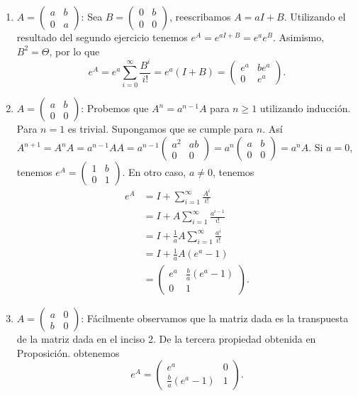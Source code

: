\documentclass{article}
\theoremstyle{definition}
\theoremstyle{remark}
\begin{document}
\begin{enumerate}
  \item
    $ A = \begin{pmatrix} a & b \\ 0 & a \end{pmatrix}$:
    Sea $B = \begin{pmatrix}0 & b \\ 0 & 0\end{pmatrix}$,
    reescribamos $A = a I + B$.
    Utilizando el resultado del segundo ejercicio tenemos
    $
      e^A = e^{aI + B} = e^a e^B.
    $
    Asimismo, $B^2 = \Theta$, por lo que
    \[
      e^A = e^a \sum_{i = 0}^{\infty} \frac{B^i}{i!} = e^a (I + B) =
      \begin{pmatrix} e^a & b e^a \\ 0 & e^a \end{pmatrix}.
    \]
  \item
    $ A = \begin{pmatrix} a & b \\ 0 & 0 \end{pmatrix}$:
    Probemos que $A^n = a^{n - 1} A$ para $n \geq 1$ utilizando inducci\'on.
    Para $n = 1$ es trivial. Supongamos que se cumple para $n$. As\'i
    $
    A^{n + 1} = A^n A = a^{n - 1} A A =
    a^{n - 1} \begin{pmatrix} a^2 & ab \\ 0 & 0 \end{pmatrix} =
    a^n \begin{pmatrix} a & b \\ 0 & 0 \end{pmatrix} =
    a^n A.
    $
    Si $a = 0$, tenemos $e^A =
    \begin{pmatrix}
        1 & b \\
        0 & 1
    \end{pmatrix}$.
    En otro caso, $a \neq 0$, tenemos
    \begin{align*}
      e^A &= I + \sum_{i = 1}^{\infty} \frac{A^i}{i!}\\
      &= I + A \sum_{i = 1}^{\infty} \frac{a^{i - 1}}{i!}\\
      &= I + \frac{1}{a} A \sum_{i = 1}^{\infty} \frac{a^i}{i!}\\
      &= I + \frac{1}{a} A (e^a - 1)\\
      &= \begin{pmatrix} e^a & \frac{b}{a}(e^a - 1) \\ 0 & 1\end{pmatrix}.
    \end{align*}
  \item
    $A = \begin{pmatrix} a & 0 \\ b & 0 \end{pmatrix}$:
    F\'acilmente observamos que la matriz dada es la transpuesta de la matriz
    dada en el inciso 2. De la tercera propiedad obtenida en Proposici\'on.
    obtenemos
    \[
      e^A = \begin{pmatrix} e^a & 0 \\ \frac{b}{a}(e^a - 1) & 1 \end{pmatrix}.
    \]
\end{enumerate}
\end{document}
